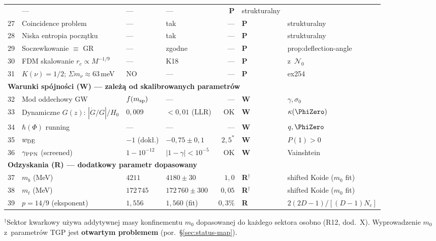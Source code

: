 \begin{center}
\begin{longtable}{@{}rp{3.8cm}llrll@{}}
   & --- & --- & --- & \textbf{P} & strukturalny \\
27 & Coincidence problem
   & --- & tak & --- & \textbf{P} & strukturalny \\
28 & Niska entropia pocz\k{a}tku
   & --- & tak & --- & \textbf{P} & strukturalny \\
29 & Soczewkowanie $\equiv$ GR
   & --- & zgodne & --- & \textbf{P} & prop:deflection-angle \\
30 & FDM skalowanie $r_c \propto M^{-1/9}$
   & --- & K18 & --- & \textbf{P} & z~$\mathcal{N}_0$ \\
%
31 & $K(\nu) = 1/2$; $\Sigma m_\nu \approx 63$\,meV
   & NO & --- & --- & \textbf{P} & ex254 \\
%
\midrule
%
%
\multicolumn{7}{l}{\textbf{Warunki sp\'ojno\'sci (W) --- zale\.z\k{a} od skalibrowanych parametr\'ow}} \\
\midrule
32 & Mod oddechowy GW
   & $f(m_{\rm sp})$ & --- & --- & \textbf{W} & $\gamma, \sigma_0$ \\
33 & Dynamiczne $G(z)$: $|\dot{G}/G|/H_0$
   & $0{,}009$ & $< 0{,}01$ (LLR) & OK & \textbf{W} & $\kappa(\PhiZero)$ \\
34 & $\hbar(\Phi)$ running
   & --- & --- & --- & \textbf{W} & $q, \PhiZero$ \\
35 & $w_{\rm DE}$
   & $-1$ (dok\l{}.) & $-0{,}75 \pm 0{,}1$ & $2{,}5^*$ & \textbf{W} & $P(1) > 0$ \\
36 & $\gamma_{\rm PPN}$ (screened)
   & $1 - 10^{-12}$ & $|1-\gamma| < 10^{-5}$ & OK & \textbf{W} & Vainshtein \\
%
\midrule
%
%
\multicolumn{7}{l}{\textbf{Odzyskania (R) --- dodatkowy parametr dopasowany}} \\
\midrule
37 & $m_b$ (MeV)
   & $4211$ & $4180 \pm 30$ & $1{,}0$ & \textbf{R}$^\dagger$ & shifted Koide ($m_0$ fit) \\
38 & $m_t$ (MeV)
   & $172\,745$ & $172\,760 \pm 300$ & $0{,}05$ & \textbf{R}$^\dagger$ & shifted Koide ($m_0$ fit) \\
39 & $p = 14/9$ (eksponent)
   & $1{,}556$ & $1{,}560$ (fit) & $0{,}3\%$ & \textbf{R} & $2(2D{-}1)/[(D{-}1)N_c]$ \\
%
\end{longtable}
\end{center}

\smallskip\noindent
$^\dagger$Sektor kwarkowy u\.zywa addytywnej masy konfinementu $m_0$
dopasowanej do ka\.zdego sektora osobno (R12, dod.~X).
Wyprowadzenie $m_0$ z~parametr\'ow TGP jest
\textbf{otwartym problemem} (por.\ \S\ref{sec:status-map}).

